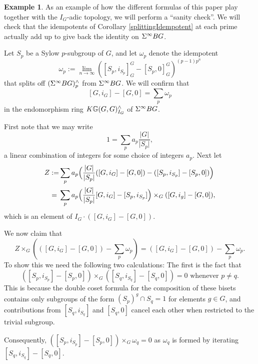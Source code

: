 \documentclass[10pt]{amsart}
\theoremstyle{definition}
\newtheorem{example}[theorem]{Example}
\begin{document}
\begin{example}
As an example of how the different formulas of this paper play together with the $I_G$-adic topology, we will perform a ``sanity check''. We will check that the idempotents of Corollary \ref{splittingIdempotent} at each prime actually add up to give back the identity on $\Sigma^{\infty} BG$.

Let $S_p$ be a Sylow $p$-subgroup of $G$, and let $\omega_p$ denote the idempotent
\[
\omega_p:= \lim_{n\to\infty} ([S_p,i_{S_p}]_G^G - [S_p,0]_G^G)^{(p-1)p^n}
\]
that splits off $(\Sigma^{\infty} BG)^\wedge_p$ from $\Sigma^{\infty} BG$. We will confirm that
\[ [G,i_G] - [G,0] = \sum_p \omega_p\] in the endomorphism ring $K \mathbb{G}(G,G)^\wedge_{I_G}$ of $\Sigma^{\infty} BG$.

First note that we may write
\begin{equation} \label{equation}
1 = \sum_p a_p \frac{\lvert G\rvert}{\lvert S_p\rvert},
\end{equation}
a linear combination of integers for some choice of integers $a_p$. Next let
\begin{align*}
Z :=& \sum_p a_p \Bigl( \frac{\lvert G\rvert}{\lvert S_p\rvert} ([G,i_G] - [G,0]) - ([S_p,i_{S_p}]-[S_p,0]) \Bigr)
\\ ={}& \sum_p a_p \Bigl( \frac{\lvert G\rvert}{\lvert S_p\rvert} [G,i_G] - [S_p,i_{S_p}] \Bigr)\times_G ([G,i_g]-[G,0]),
\end{align*}
which is an element of $I_G\cdot([G,i_G]-[G,0])$.

We now claim that
\begin{equation}\label{eqProductInAugmentationIdeal}
Z \times_G ( ([G,i_G]-[G,0]) - \sum_p \omega_p ) = ([G,i_G]-[G,0]) - \sum_p \omega_p.
\end{equation}
To show this we need the following two calculations:
The first is the fact that
\[([S_p,i_{S_p}] - [S_p,0]) \times_G ([S_q,i_{S_q}] - [S_q,0]) = 0\text{ whenever $p \neq q$.}\]
This is because the double coset formula for the composition of these bisets contains only subgroups of the form $(S_p)^g\cap S_q=1$ for elements $g\in G$, and contributions from $[S_q,i_{S_q}]$ and $[S_q,0]$ cancel each other when restricted to the trivial subgroup.

Consequently, $([S_p,i_{S_p}] - [S_p,0]) \times_G \omega_q = 0$ as $\omega_q$ is formed by iterating $[S_q,i_{S_q}] - [S_q,0]$.


\end{example}
\end{document}

